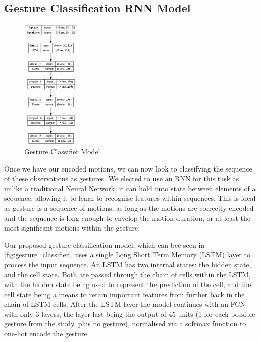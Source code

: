 \subsection{Gesture Classification RNN Model}
\begin{figure}
    \centering
    \includegraphics[width=0.25\textwidth]{figures/gesture_model.png}
    \caption{\label{fig:gesture_classifier} Gesture Classifier Model}
\end{figure}
Once we have our encoded motions, we can now look to classifying the sequence of these observations as gestures.
We elected to use an RNN for this task as, unlike a traditional Neural Network, it can hold onto state between elements of a sequence, allowing it to learn to recognise features within sequences. This is ideal as gesture is a sequence of motions, as long as the motions are correctly encoded and the sequence is long enough to envelop the motion duration, or at least the most significant motions within the gesture.

Our proposed gesture classification model, which can bee seen in \autoref{fig:gesture_classifier}, uses a single Long Short Term Memory (LSTM) layer to process the input sequence. An LSTM has two internal states: the hidden state, and the cell state. Both are passed through the chain of cells within the LSTM, with the hidden state being used to represent the prediction of the cell, and the cell state being a means to retain important features from further back in the chain of LSTM cells.
After the LSTM layer the model continues with an FCN with only 3 layers, the layer last being the output of 45 units (1 for each possible gesture from the study, plus no gesture), normalised via a softmax function to one-hot encode the gesture.

